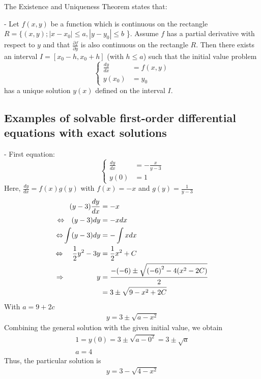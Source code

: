 \documentclass[a4paper]{article}
\begin{document}
The Existence and Uniqueness Theorem states that:

- Let \(f(x,y)\) be a function which is continuous on the rectangle  \(R = \{(x, y); |x - x_0| \leq a, |y - y_0| \leq b\) \}.
Assume \(f\) has a partial derivative with respect to \(y\) and that \(\frac{\partial f}{\partial y}\) is also continuous on the rectangle \(R\).
Then there exists an interval \(I=[x_0-h, x_0+h]\) (with \(h \leq a\)) such that the initial value problem
\begin{equation*}
  \begin{cases}
    \frac{dy}{dx} & = f(x,y) \\
    y(x_0)        & = y_0
  \end{cases}
\end{equation*}
has a unique solution \(y(x)\) defined on the interval \(I\).


\subsection{Examples of solvable first-order differential equations with exact solutions}
- First equation:
\begin{equation*}
  \begin{cases}
    \frac{dy}{dx} & = - \frac{x}{y - 3} \\
    y(0)          & = 1
  \end{cases}
\end{equation*}
Here, \(\frac{dy}{dx} = f(x)g(y)\) with \(f(x) = -x\) and \(g(y) = \frac{1}{y-3}\)
\begin{align*}
  (y - 3) \frac{dy}{dx}                                     & = -x                                                \\
  {\color{black}\Leftrightarrow} ~~~ (y - 3) dy             & = -x dx                                             \\
  {\color{black}\Leftrightarrow}  \int (y - 3) dy           & = -\int xdx                                         \\
  {\color{black}\Leftrightarrow} ~~~~ \frac {1}{2} y^2 - 3y & = \frac{1}{2} x^2 + C                               \\
  {\color{black}\Rightarrow} ~~~~~~~~~~~~~~ y               & = \frac{-(-6) \pm \sqrt{{(-6)}^2 - 4(x^2 - 2C)}}{2} \\
                                                            & = 3 \pm \sqrt{9 - x^2 + 2C}
\end{align*}
With \(a = 9 + 2c\)
\begin{align*}
  y = 3 \pm \sqrt{a - x^2}
\end{align*}
Combining the general solution with the given initial value, we obtain
\begin{align*}
  1 = y(0) = 3 \pm \sqrt{a - 0^2} = 3 \pm \sqrt{a} \\
  a = 4
\end{align*}
Thus, the particular solution is
\begin{align*}
  y = 3 - \sqrt{4-x^2}
\end{align*} \\
\end{document}
